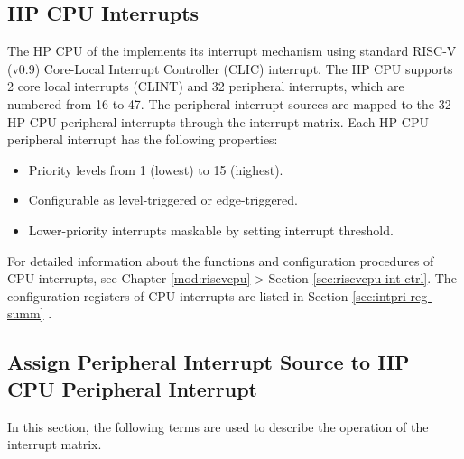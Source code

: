\documentclass[main\_\_EN.tex]{subfiles}
\begin{document}
\clearpage
{}

\begin{landscape}

\end{landscape}
\restoregeometry
\clearpage

\subsection{HP CPU Interrupts}

The HP CPU of the \chipname{} implements its interrupt mechanism using standard RISC-V (v0.9) Core-Local Interrupt Controller (CLIC) interrupt. The HP CPU supports 2 core local interrupts (CLINT) and 32 peripheral interrupts, which are numbered from 16 to 47. The peripheral interrupt sources are mapped to the 32 HP CPU peripheral interrupts through the interrupt matrix. Each HP CPU peripheral interrupt has the following properties:

\begin{itemize}
    \item Priority levels from 1 (lowest) to 15 (highest).
    \item Configurable as level-triggered or edge-triggered.
    \item Lower-priority interrupts maskable by setting interrupt threshold.
\end{itemize}

\begin{tiplisting}
For detailed information about the functions and configuration procedures of CPU interrupts, see Chapter \ref{mod:riscvcpu} \textit{} > Section \ref{sec:riscvcpu-int-ctrl}\textit{}. The configuration registers of CPU interrupts are listed in Section \ref{sec:intpri-reg-summ} \textit{}.
\end{tiplisting}
\vspace{-1em}

\subsection{Assign Peripheral Interrupt Source to HP CPU Peripheral Interrupt}

In this section, the following terms are used to describe the operation of the interrupt matrix.
\end{document}
